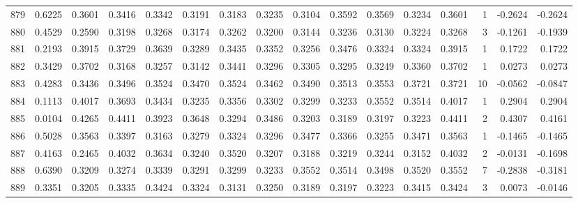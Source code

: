 \begin{tabular}{lrrrrrrrrrrrrrrr}
879 &      0.6225 &  0.3601 &  0.3416 &  0.3342 &  0.3191 &  0.3183 &  0.3235 &  0.3104 &  0.3592 &  0.3569 &   0.3234 &     0.3601 &      1 &                   -0.2624 &                    -0.2624 \\
880 &      0.4529 &  0.2590 &  0.3198 &  0.3268 &  0.3174 &  0.3262 &  0.3200 &  0.3144 &  0.3236 &  0.3130 &   0.3224 &     0.3268 &      3 &                   -0.1261 &                    -0.1939 \\
881 &      0.2193 &  0.3915 &  0.3729 &  0.3639 &  0.3289 &  0.3435 &  0.3352 &  0.3256 &  0.3476 &  0.3324 &   0.3324 &     0.3915 &      1 &                    0.1722 &                     0.1722 \\
882 &      0.3429 &  0.3702 &  0.3168 &  0.3257 &  0.3142 &  0.3441 &  0.3296 &  0.3305 &  0.3295 &  0.3249 &   0.3360 &     0.3702 &      1 &                    0.0273 &                     0.0273 \\
883 &      0.4283 &  0.3436 &  0.3496 &  0.3524 &  0.3470 &  0.3524 &  0.3462 &  0.3490 &  0.3513 &  0.3553 &   0.3721 &     0.3721 &     10 &                   -0.0562 &                    -0.0847 \\
884 &      0.1113 &  0.4017 &  0.3693 &  0.3434 &  0.3235 &  0.3356 &  0.3302 &  0.3299 &  0.3233 &  0.3552 &   0.3514 &     0.4017 &      1 &                    0.2904 &                     0.2904 \\
885 &      0.0104 &  0.4265 &  0.4411 &  0.3923 &  0.3648 &  0.3294 &  0.3486 &  0.3203 &  0.3189 &  0.3197 &   0.3223 &     0.4411 &      2 &                    0.4307 &                     0.4161 \\
886 &      0.5028 &  0.3563 &  0.3397 &  0.3163 &  0.3279 &  0.3324 &  0.3296 &  0.3477 &  0.3366 &  0.3255 &   0.3471 &     0.3563 &      1 &                   -0.1465 &                    -0.1465 \\
887 &      0.4163 &  0.2465 &  0.4032 &  0.3634 &  0.3240 &  0.3520 &  0.3207 &  0.3188 &  0.3219 &  0.3244 &   0.3152 &     0.4032 &      2 &                   -0.0131 &                    -0.1698 \\
888 &      0.6390 &  0.3209 &  0.3274 &  0.3339 &  0.3291 &  0.3299 &  0.3233 &  0.3552 &  0.3514 &  0.3498 &   0.3520 &     0.3552 &      7 &                   -0.2838 &                    -0.3181 \\
889 &      0.3351 &  0.3205 &  0.3335 &  0.3424 &  0.3324 &  0.3131 &  0.3250 &  0.3189 &  0.3197 &  0.3223 &   0.3415 &     0.3424 &      3 &                    0.0073 &                    -0.0146 \\

\end{tabular}
